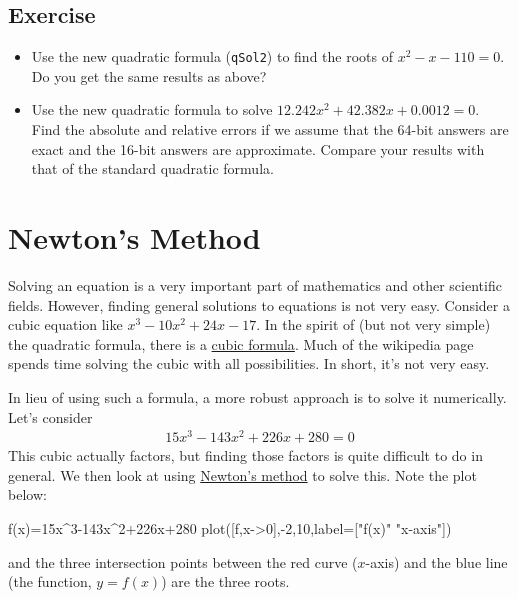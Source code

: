 \subsection{Exercise}

\begin{itemize}
\item Use the new quadratic formula (\texttt{qSol2}) to find the roots of  $x^{2}-x-110=0$. Do you get the same results as above?
\item  Use the new quadratic formula to solve $12.242{x}^{2}+42.382x+0.0012=0$. Find the absolute and relative errors if we assume that the 64-bit answers are exact and the 16-bit answers are approximate.  Compare your results with that of the standard quadratic formula.
\end{itemize}

\hypertarget{sect:newton}{%
\section{Newton's Method}\label{sect:newton}}

Solving an equation is a very important part of mathematics and other
scientific fields. However, finding general solutions to equations is
not very easy. Consider a cubic equation like $x^{3}-10x^{2}+24x-17$.
In the spirit of (but not very simple) the quadratic formula, there is a
\href{https://en.wikipedia.org/wiki/Cubic_function\#Roots_of_a_cubic_function}{cubic
formula}. Much of the wikipedia page spends time solving the cubic with
all possibilities. In short, it's not very easy.

In lieu of using such a formula, a more robust approach is to solve it
numerically. Let's consider
%
\begin{align*}
15{x}^{3}-143{x}^2+226x+280=0
\end{align*}
%
This cubic actually factors, but finding those factors is quite
difficult to do in general. We then look at using
\href{https://en.wikipedia.org/wiki/Newton\%27s_method}{Newton's method}
to solve this. Note the plot below:

\begin{jlcode}[root]
f(x)=15x^3-143x^2+226x+280
plot([f,x->0],-2,10,label=["f(x)" "x-axis"])
\end{jlcode}
\begin{center}
\pgfplotsset{scale=0.7}
\end{center}
and the three intersection points between the red curve ($x$-axis) and the blue
line (the function, $y=f(x)$) are the three roots.

